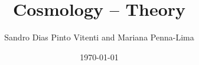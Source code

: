 \documentclass[a4paper]{article}
\title{Cosmology -- Theory}
\author{Sandro Dias Pinto Vitenti and Mariana Penna-Lima}
\date{\today}
\begin{document}
\maketitle

\nocite{Pequignot1991}
\nocite{Hummer1998}
\nocite{Seager1999}
\nocite{Seager2000}
\nocite{Linder2003}
\nocite{Jassal2005}
\nocite{Eisenstein2005}
\nocite{Percival2007}
\nocite{Weinberg2008}
\nocite{Conley2011}



\end{document}
